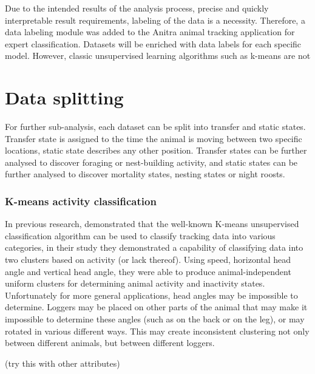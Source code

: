 Due to the intended results of the analysis process, precise and quickly interpretable result requirements, labeling of the data is a necessity. Therefore, a data labeling module was added to the Anitra animal tracking application for expert classification. Datasets will be enriched with data labels for each specific model. However, classic unsupervised learning algorithms such as k-means are not 

\section{Data splitting}

For further sub-analysis, each dataset can be split into transfer and static states. Transfer state is assigned to the time the animal is moving between two specific locations, static state describes any other position. Transfer states can be further analysed to discover foraging or nest-building activity, and static states can be further analysed to discover mortality states, nesting states or night roosts.

\subsubsection{K-means activity classification}

In previous research, \citeauthor{schwager2007robust} demonstrated that the well-known K-means unsupervised classification algorithm can be used to classify tracking data into various categories, in their study they demonstrated a capability of classifying data into two clusters based on activity (or lack thereof). Using speed, horizontal head angle and vertical head angle, they were able to produce animal-independent uniform clusters for determining animal activity and inactivity states. Unfortunately for more general applications, head angles may be impossible to determine. Loggers may be placed on other parts of the animal that may make it impossible to determine these angles (such as on the back or on the leg), or may rotated in various different ways. This may create inconsistent clustering not only between different animals, but between different loggers.

(try this with other attributes)